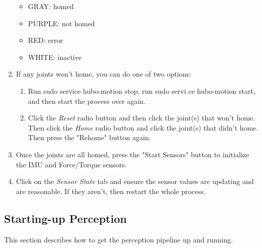 \documentclass[letterpaper, 10 pt]{report}
\begin{document}
\begin{enumerate}
    \begin{itemize}
      \item GRAY: homed
      \item PURPLE: not homed
      \item RED: error
      \item WHITE: inactive
    \end{itemize}
  \item If any joints won't home, you can do one of two options:
    \begin{enumerate}
      \item Run sudo service hubo-motion stop, run sudo servi	ce hubo-motion start, and then start the process over again.
      \item Click the \textit{Reset} radio button and then click the joint(s) that won't home. Then click the \textit{Home} radio button and click the joint(s) that didn't home. Then press the "Rehome" button again.
    \end{enumerate}
  \item Once the joints are all homed, press the "Start Sensors" button to initialize the IMU and Force/Torque sensors.
  \item Click on the \textit{Sensor State} tab and ensure the sensor values are updating and are reasonable. If they aren't, then restart the whole process.
\end{enumerate}

\subsection*{Starting-up Perception}
This section describes how to get the perception pipeline up and running. 
\end{document}

